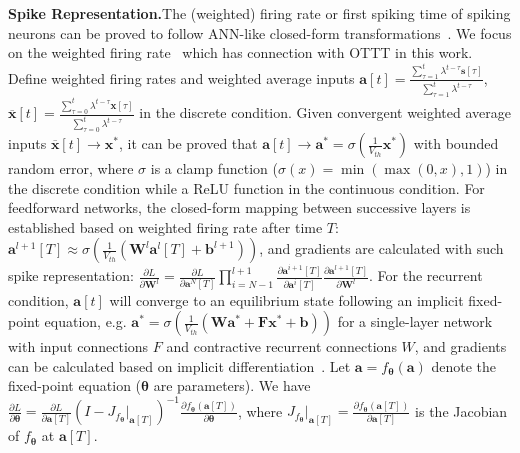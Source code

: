 \documentclass{article}
\begin{document}
\textbf{Spike Representation.}\quad The (weighted) firing rate or first spiking time of spiking neurons can be proved to follow ANN-like closed-form transformations~\cite{deng2021optimal,zhou2021temporal,wu2021tandem,xiao2021training,meng2022training}. We focus on the weighted firing rate~\cite{xiao2021training,meng2022training} which has connection with OTTT in this work. Define weighted firing rates and weighted average inputs $\mathbf{a}[t]=\frac{\sum_{\tau=1}^t \lambda^{t-\tau}\mathbf{s}[\tau]}{\sum_{\tau=1}^t \lambda^{t-\tau}}$, $\mathbf{\overline{x}}[t]=\frac{\sum_{\tau=0}^t \lambda^{t-\tau}\mathbf{x}[\tau]}{\sum_{\tau=0}^t \lambda^{t-\tau}}$ in the discrete condition. Given convergent weighted average inputs $\mathbf{\overline{x}}[t]\rightarrow \mathbf{x^*}$, it can be proved that $\mathbf{a}[t]\rightarrow \mathbf{a^*} = \sigma\left(\frac{1}{V_{th}}\mathbf{x^*}\right)$ with bounded random error, where $\sigma$ is a clamp function ($\sigma(x)=\min(\max(0, x), 1)$) in the discrete condition while a ReLU function in the continuous condition. 
For feedforward networks, the closed-form mapping between successive layers is established based on weighted firing rate after time $T$: $\mathbf{a}^{l+1}[T] \approx \sigma\left(\frac{1}{V_{th}}\left(\mathbf{W}^l\mathbf{a}^l[T]+\mathbf{b}^{l+1}\right)\right)$, and gradients are calculated with such spike representation: $\frac{\partial L}{\partial \mathbf{W}^l}=\frac{\partial L}{\partial \mathbf{a}^N[T]}\prod_{i=N-1}^{l+1}\frac{\partial \mathbf{a}^{i+1}[T]}{\partial \mathbf{a}^i[T]}\frac{\partial \mathbf{a}^{l+1}[T]}{\partial \mathbf{W}^l}$. For the recurrent condition, $\mathbf{a}[t]$ will converge to an equilibrium state following an implicit fixed-point equation, e.g. $\mathbf{a^*} = \sigma\left(\frac{1}{V_{th}}\left(\mathbf{W}\mathbf{a^*}+\mathbf{F}\mathbf{x^*}+\mathbf{b}\right)\right)$ for a single-layer network with input connections $F$ and contractive recurrent connections $W$, and gradients can be calculated based on implicit differentiation~\cite{xiao2021training}. Let $\mathbf{a}=f_{\bm{\theta}}(\mathbf{a})$ denote the fixed-point equation ($\bm{\theta}$ are parameters). We have $\frac{\partial L}{\partial \bm{\theta}} = \frac{\partial L}{\partial \mathbf{a}[T]} \left(I-J_{f_{\bm{\theta}}}\vert_{\mathbf{a}[T]}\right)^{-1} \frac{\partial f_{\bm{\theta}}(\mathbf{a}[T])}{\partial \bm{\theta}}$, where $J_{f_{\bm{\theta}}}\vert_{\mathbf{a}[T]}=\frac{\partial f_{\bm{\theta}}(\mathbf{a}[T])}{\partial \mathbf{a}[T]}$ is the Jacobian of $f_{\bm{\theta}}$ at $\mathbf{a}[T]$.
\end{document}
